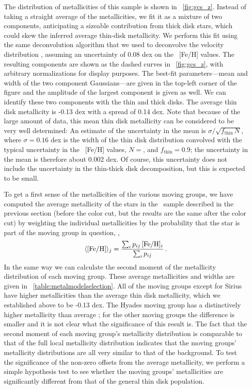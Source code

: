 The distribution of metallicities of this sample is shown in
\figurename~\ref{fig:gcs_z}. Instead of taking a straight average of
the metallicities, we fit it as a mixture of two components,
anticipating a sizeable contribution from thick disk stars, which
could skew the inferred average thin-disk metallicity. We perform this
fit using the same deconvolution algorithm that we used to deconvolve
the velocity distribution \citep{BovyXD}, assuming an uncertainty of
0.08 dex on the \gcsabb\ [Fe/H] values. The resulting components are
shown as the dashed curves in \figurename~\ref{fig:gcs_z}, with
arbitrary normalizations for display purposes. The best-fit
parameters---mean and width of the two component Gaussians---are given
in the top-left corner of the figure and the amplitude of the largest
component is given as well. We can identify these two components with
the thin and thick disks. The average thin disk metallicity is -0.13
dex with a spread of 0.14 dex. Note that because of the large amount
of data, this mean thin disk metallicity can be considered to be very
well determined: An estimate of the uncertainty in the mean is
$\sigma/\sqrt{f_{\mathrm{thin}}\,N}$, where $\sigma=0.16$ dex is the
width of the thin disk distribution convolved with the typical
uncertainty in the \gcsabb\ [Fe/H] values, $N=$\ngcsstars, and
$f_{\mathrm{thin}}=0.9$; the uncertainty in the mean is therefore
about 0.002 dex. Of course, this uncertainty does not include the
uncertainty in the thin-thick disk decomposition, but this is expected
to be small.

To get a first sense of the metallicities of the various moving
groups, we have computed the average metallicity of the stars in the
\gcsabb\ sample described in the previous section (before the color
cut, but the results are the same after the color cut) by weighting
the individual metallicities by the probability that the star is part
of the moving group in question, \ie,
\begin{equation}\label{eq:avgmetal}
\langle[\mathrm{Fe/H}]\rangle_j = \frac{\sum_i
  p_{ij}\,[\mathrm{Fe/H}]_i}{\sum_i p_{ij}}\,.
\end{equation}
In the same way we can calculate the second moment of the metallicity
distribution of each moving group.  These average metallicities and
widths are given in \tablename~\ref{table:metalmodelselection}. All of
the moving groups except for Sirius have higher metallicities than the
average thin disk metallicity, which we established above to be -0.13
dex. The Hyades moving group has a distinctively higher metallicity
than average \citep[see also][who find about the same value from a
simple cut in velocity space]{Famaey07a}; for the other moving groups
the difference is smaller and it is not clear what the significance of
this result is. The fact that the second moment of each moving group's
metallicity distribution is comparable to that of the full local
metallicity distribution indicates that the moving groups' metallicity
distributions are all very similar to that of the background. To test
the significance of the non-zero offsets from the average metallicity,
we perform a simple hypothesis test to see whether the moving groups'
metallicities are significantly different from that of the general
thin disk population.

